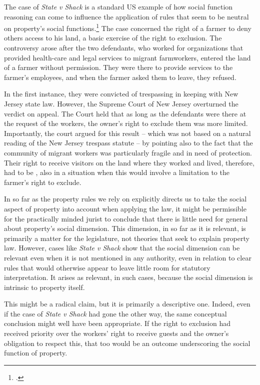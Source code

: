 The case of {\it State v Shack} is a standard US example of how social function reasoning can come to influence the application of rules that seem to be neutral on property's social functions.\footcite{shack71} The case concerned the right of a farmer to deny others access to his land, a basic exercise of the right to exclusion. The controversy arose after the two defendants, who worked for organizations that provided health-care and legal services to migrant farmworkers, entered the land of a farmer without permission. They were there to provide services to the farmer's employees, and when the farmer asked them to leave, they refused.

In the first instance, they were convicted of trespassing in keeping with New Jersey state law. However, the Supreme Court of New Jersey overturned the verdict on appeal. The Court held that as long as the defendants were there at the request of the workers, the owner's right to exclude them was more limited. Importantly, the court argued for this result -- which was not based on a natural reading of the New Jersey trespass statute -- by pointing also to the fact that the community of migrant workers was particularly fragile and in need of protection. Their right to receive visitors on the land where they worked and lived, therefore, had to be , also in a situation when this would involve a limitation to the farmer's right to exclude.

In so far as the property rules we rely on explicitly directs us to take the social aspect of property into account when applying the law, it might be permissible for the practically minded jurist to conclude that there is little need for general  about property's social dimension. This dimension, in so far as it is relevant, is primarily a matter for the legislature, not theories that seek to explain property law. However, cases like {\it State v Shack} show that the social dimension can be relevant even when it is not mentioned in any authority, even in relation to clear rules that would otherwise appear to leave little room for statutory interpretation. It arises as relevant, in such cases, because the social dimension is intrinsic to property itself.

This might be a radical claim, but it is primarily a descriptive one. Indeed, even if the case of {\it State v Shack} had gone the other way, the same conceptual conclusion might well have been appropriate. If the right to exclusion had received priority over the workers' right to receive guests and the owner's obligation to respect this, that too would be an outcome underscoring the social function of property. 

